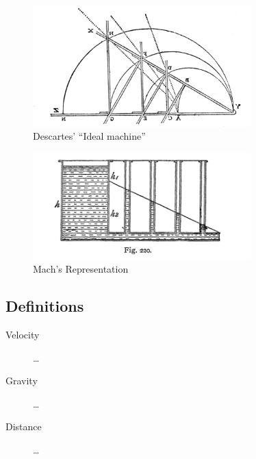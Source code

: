 \documentclass{article}
\begin{document}
\begin{figure}[h]
\begin{center}
\includegraphics[width=0.75\textwidth]{idealInstrument} %
\caption{Descartes' ``Ideal machine''}
\label{fig:idealInstrument}
\end{center}
\end{figure}

\begin{figure}[h]
\begin{center}
\includegraphics[width=0.75\textwidth]{machVenturi} %
\caption{Mach's Representation}
\label{fig:machVenturi}
\end{center}
\end{figure}





\subsection{Definitions}
\label{definitions}
\begin{description}
  \item[Velocity]
  \dots
  \item[Gravity]
  \dots
  \item[Distance]
  \dots
\end{description}
\end{document}
